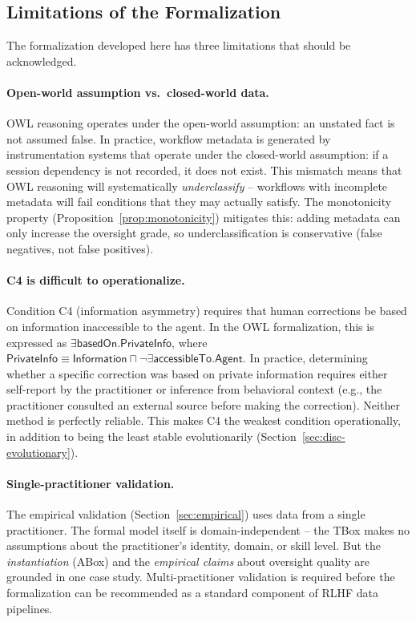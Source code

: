 \documentclass[11pt]{article}
\begin{document}
\subsection{Limitations of the Formalization}
\label{sec:disc-limitations}

The formalization developed here has three limitations that should be acknowledged.

\paragraph{Open-world assumption vs.\ closed-world data.}
OWL reasoning operates under the open-world assumption: an unstated fact is not assumed false.
In practice, workflow metadata is generated by instrumentation systems that operate under the closed-world assumption: if a session dependency is not recorded, it does not exist.
This mismatch means that OWL reasoning will systematically \emph{underclassify} -- workflows with incomplete metadata will fail conditions that they may actually satisfy.
The monotonicity property (Proposition~\ref{prop:monotonicity}) mitigates this: adding metadata can only increase the oversight grade, so underclassification is conservative (false negatives, not false positives).

\paragraph{C4 is difficult to operationalize.}
Condition C4 (information asymmetry) requires that human corrections be based on information inaccessible to the agent.
In the OWL formalization, this is expressed as $\exists\mathsf{basedOn}.\mathsf{PrivateInfo}$, where $\mathsf{PrivateInfo} \equiv \mathsf{Information} \sqcap \neg\exists\mathsf{accessibleTo}.\mathsf{Agent}$.
In practice, determining whether a specific correction was based on private information requires either self-report by the practitioner or inference from behavioral context (e.g., the practitioner consulted an external source before making the correction).
Neither method is perfectly reliable.
This makes C4 the weakest condition operationally, in addition to being the least stable evolutionarily (Section~\ref{sec:disc-evolutionary}).

\paragraph{Single-practitioner validation.}
The empirical validation (Section~\ref{sec:empirical}) uses data from a single practitioner.
The formal model itself is domain-independent -- the TBox makes no assumptions about the practitioner's identity, domain, or skill level.
But the \emph{instantiation} (ABox) and the \emph{empirical claims} about oversight quality are grounded in one case study.
Multi-practitioner validation is required before the formalization can be recommended as a standard component of RLHF data pipelines.
\end{document}
